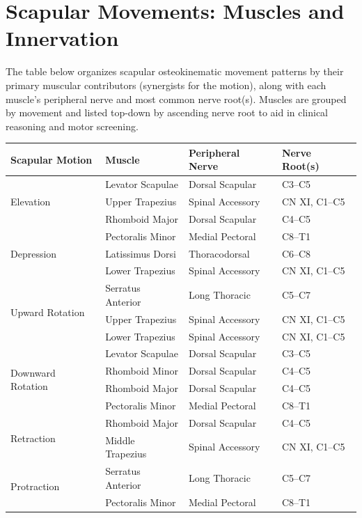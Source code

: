 \section*{Scapular Movements: Muscles and Innervation}

\vspace{.5cm}

\noindent
The table below organizes scapular osteokinematic movement patterns by their primary muscular contributors (synergists for the motion), along with each muscle’s peripheral nerve and most common nerve root(s). Muscles are grouped by movement and listed top-down by ascending nerve root to aid in clinical reasoning and motor screening.

\begin{tabular}{|p{4cm}|p{4.5cm}|p{4cm}|p{2.5cm}|}
\hline
\textbf{Scapular Motion} & \textbf{Muscle} & \textbf{Peripheral Nerve} & \textbf{Nerve Root(s)} \\
\hline
\multirow{3}{*}{Elevation} 
  & Levator Scapulae & Dorsal Scapular & C3–C5 \\
  & Upper Trapezius & Spinal Accessory & CN XI, C1–C5 \\
  & Rhomboid Major & Dorsal Scapular & C4–C5 \\
\hline
\multirow{3}{*}{Depression}
  & Pectoralis Minor & Medial Pectoral & C8–T1 \\
  & Latissimus Dorsi & Thoracodorsal & C6–C8 \\
  & Lower Trapezius & Spinal Accessory & CN XI, C1–C5 \\
\hline
\multirow{3}{*}{Upward Rotation}
  & Serratus Anterior & Long Thoracic & C5–C7 \\
  & Upper Trapezius & Spinal Accessory & CN XI, C1–C5 \\
  & Lower Trapezius & Spinal Accessory & CN XI, C1–C5 \\
\hline
\multirow{4}{*}{Downward Rotation}
  & Levator Scapulae & Dorsal Scapular & C3–C5 \\
  & Rhomboid Minor & Dorsal Scapular & C4–C5 \\
  & Rhomboid Major & Dorsal Scapular & C4–C5 \\
  & Pectoralis Minor & Medial Pectoral & C8–T1 \\
\hline
\multirow{2}{*}{Retraction}
  & Rhomboid Major & Dorsal Scapular & C4–C5 \\
  & Middle Trapezius & Spinal Accessory & CN XI, C1–C5 \\
\hline
\multirow{2}{*}{Protraction}
  & Serratus Anterior & Long Thoracic & C5–C7 \\
  & Pectoralis Minor & Medial Pectoral & C8–T1 \\
\hline
\end{tabular}

